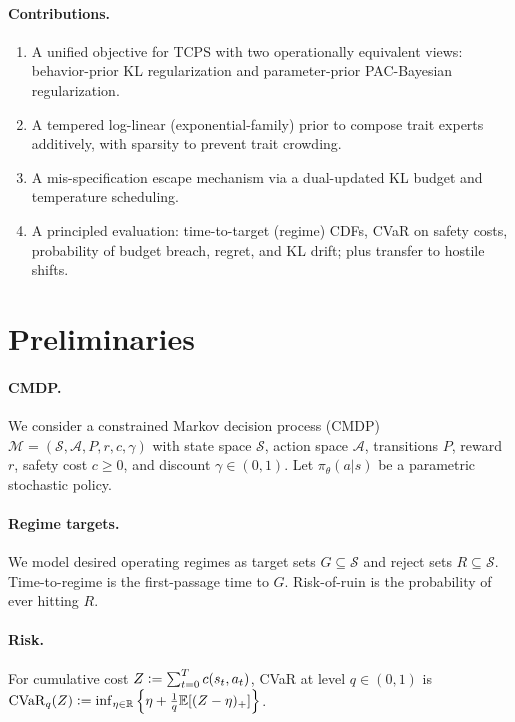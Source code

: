 \documentclass[10pt]{article}
\theoremstyle{plain}
\theoremstyle{definition}
\theoremstyle{remark}
\newcommand{\E}{\mathbb{E}}
\newcommand{\R}{\mathbb{R}}
\newcommand{\1}{\mathds{1}}
\newcommand{\cvar}{\mathrm{CVaR}}
\newcommand{\defeq}{\vcentcolon=}
\begin{document}
\paragraph{Contributions.}
\begin{enumerate}[leftmargin=1.5em,itemsep=2pt,topsep=2pt]
\item A unified objective for TCPS with two operationally equivalent views: behavior-prior KL regularization and parameter-prior PAC-Bayesian regularization.
\item A tempered log-linear (exponential-family) prior to compose trait experts additively, with sparsity to prevent trait crowding.
\item A mis-specification escape mechanism via a dual-updated KL budget and temperature scheduling.
\item A principled evaluation: time-to-target (regime) CDFs, CVaR on safety costs, probability of budget breach, regret, and KL drift; plus transfer to hostile shifts.
\end{enumerate}

\section{Preliminaries}
\label{sec:prelim}
\paragraph{CMDP.}
We consider a constrained Markov decision process (CMDP) $\mathcal{M}=(\mathcal{S},\mathcal{A},P,r,c,\gamma)$ with state space $\mathcal{S}$, action space $\mathcal{A}$, transitions $P$, reward $r$, safety cost $c\ge 0$, and discount $\gamma\in(0,1)$. Let $\pi_\theta(a|s)$ be a parametric stochastic policy.

\paragraph{Regime targets.}
We model desired operating regimes as target sets $G\subseteq \mathcal{S}$ and reject sets $R\subseteq \mathcal{S}$. Time-to-regime is the first-passage time to $G$. Risk-of-ruin is the probability of ever hitting $R$.

\paragraph{Risk.}
For cumulative cost $Z\defeq\sum_{t=0}^{T} c(s_t,a_t)$, CVaR at level $q\in(0,1)$ is
$\cvar_q(Z)\defeq \inf_{\eta\in\R}\left\{\eta + \frac{1}{q}\E[(Z-\eta)_+]\right\}$.
\end{document}

